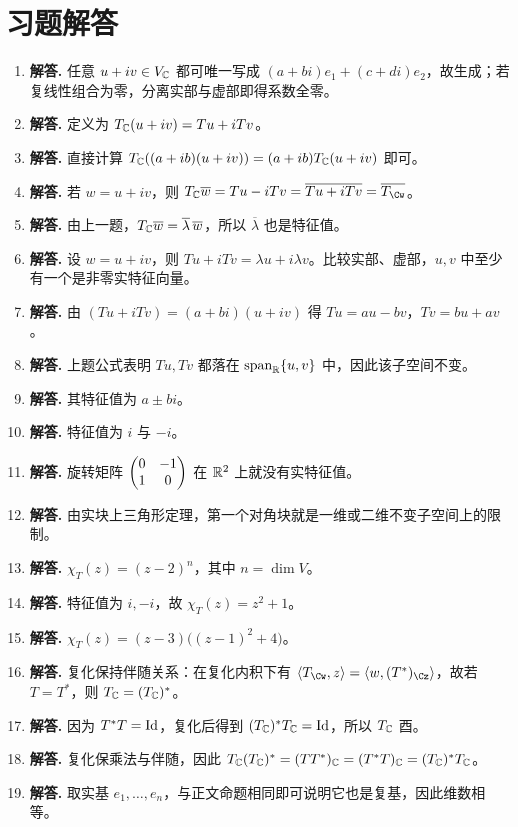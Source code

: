 \section*{习题解答}
\begin{enumerate}[label=\textbf{\arabic*.}, leftmargin=*, itemsep=1em]
\item \textbf{解答.} 任意 $u+iv\in V_{\mathbb{C}}$ 都可唯一写成 $(a+bi)e_1+(c+di)e_2$，故生成；若复线性组合为零，分离实部与虚部即得系数全零。
\item \textbf{解答.} 定义为 $T_{\mathbb{C}}(u+iv)=Tu+iTv$。
\item \textbf{解答.} 直接计算 $T_{\mathbb{C}}((a+ib)(u+iv))=(a+ib)T_{\mathbb{C}}(u+iv)$ 即可。
\item \textbf{解答.} 若 $w=u+iv$，则 $T_\C\overline{w}=Tu-iTv=\overline{Tu+iTv}=\overline{T_\Cw}$。
\item \textbf{解答.} 由上一题，$T_{\mathbb{C}}\overline{w}=\overline{\lambda}\,\overline{w}$，所以 $\overline{\lambda}$ 也是特征值。
\item \textbf{解答.} 设 $w=u+iv$，则 $Tu+iTv=\lambda u+i\lambda v$。比较实部、虚部，$u,v$ 中至少有一个是非零实特征向量。
\item \textbf{解答.} 由 $(Tu+iTv)=(a+bi)(u+iv)$ 得 $Tu=au-bv$，$Tv=bu+av$。
\item \textbf{解答.} 上题公式表明 $Tu,Tv$ 都落在 $\operatorname{span}_{\mathbb{R}}\{u,v\}$ 中，因此该子空间不变。
\item \textbf{解答.} 其特征值为 $a\pm bi$。
\item \textbf{解答.} 特征值为 $i$ 与 $-i$。
\item \textbf{解答.} 旋转矩阵 $\begin{pmatrix} 0&-1\\1&0 \end{pmatrix}$ 在 $\mathbb{R}^2$ 上就没有实特征值。
\item \textbf{解答.} 由实块上三角形定理，第一个对角块就是一维或二维不变子空间上的限制。
\item \textbf{解答.} $\chi_T(z)=(z-2)^n$，其中 $n=\dim V$。
\item \textbf{解答.} 特征值为 $i,-i$，故 $\chi_T(z)=z^2+1$。
\item \textbf{解答.} $\chi_T(z)=(z-3)\big((z-1)^2+4\big)$。
\item \textbf{解答.} 复化保持伴随关系：在复化内积下有 $\inner{T_\Cw}{z}=\inner{w}{(T^*)_\Cz}$，故若 $T=T^*$，则 $T_{\mathbb{C}}=(T_{\mathbb{C}})^*$。
\item \textbf{解答.} 因为 $T^*T=\mathrm{Id}$，复化后得到 $(T_{\mathbb{C}})^*T_{\mathbb{C}}=\mathrm{Id}$，所以 $T_{\mathbb{C}}$ 酉。
\item \textbf{解答.} 复化保乘法与伴随，因此 $T_{\mathbb{C}}(T_{\mathbb{C}})^*=(TT^*)_{\mathbb{C}}=(T^*T)_{\mathbb{C}}=(T_{\mathbb{C}})^*T_{\mathbb{C}}$。
\item \textbf{解答.} 取实基 $e_1,\dots,e_n$，与正文命题相同即可说明它也是复基，因此维数相等。

\end{enumerate}
